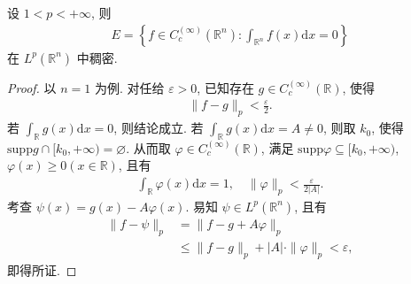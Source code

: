 \documentclass[../../main.tex]{subfiles}%
\begin{document}
\begin{example}
设 $1<p<+\infty$, 则
\begin{align*}
E = \left\{ f\in C_c^{(\infty)}(\mathbb{R}^n): \int_{\mathbb{R}^n} f(x) \mathrm{d}x=0 \right\}
\end{align*}
在 $L^p(\mathbb{R}^n)$ 中稠密.
\end{example}
\begin{proof}

以 $n=1$ 为例. 对任给 $\varepsilon>0$, 已知存在 $g\in C_c^{(\infty)}(\mathbb{R})$, 使得
\begin{align*}
\|f-g\|_p <\frac{ \varepsilon}{2}.
\end{align*}
若 $\int_{\mathbb{R}} g(x) \mathrm{d}x=0$, 则结论成立. 若 $\int_{\mathbb{R}} g(x) \mathrm{d}x=A\neq 0$, 则取 $k_0$, 使得 $\mathrm{supp}g\cap [k_0,+\infty)=\varnothing$. 从而取 $\varphi\in C_c^{(\infty)}(\mathbb{R})$, 满足 $\mathrm{supp}\varphi\subseteq [k_0,+\infty)$, $\varphi(x)\geqslant 0(x\in \mathbb{R})$, 且有
\begin{align*}
\int_{\mathbb{R}} \varphi(x) \mathrm{d}x=1, \quad \|\varphi\|_p < \frac{\varepsilon}{2|A|}.
\end{align*}
考查 $\psi(x)=g(x)-A\varphi(x)$. 易知 $\psi\in L^p(\mathbb{R}^n)$, 且有
\begin{align*}
\|f-\psi\|_p &= \|f-g+A\varphi\|_p \\
&\leqslant \|f-g\|_p + |A|\cdot \|\varphi\|_p < \varepsilon,
\end{align*}
即得所证.
\end{proof}
\end{document}
